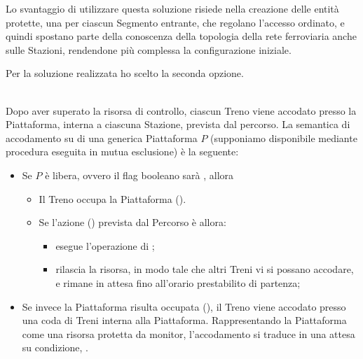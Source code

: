 \begin{description}
\begin{enumerate}
			Lo svantaggio di utilizzare questa soluzione risiede nella creazione delle entità protette, una per ciascun Segmento entrante, che regolano l'accesso ordinato, e quindi spostano parte della conoscenza della topologia della rete ferroviaria anche sulle Stazioni, rendendone più complessa la configurazione iniziale.
		\end{enumerate} 
		
		Per la soluzione realizzata ho scelto la seconda opzione.
		
		\item{}\\
		
		Dopo aver superato la risorsa di controllo, ciascun Treno viene accodato presso la Piattaforma, interna a ciascuna Stazione, prevista dal percorso. La semantica di accodamento su di una generica Piattaforma $P$ (supponiamo disponibile mediante procedura eseguita in mutua esclusione) è la seguente:
		\begin{itemize}
			\item Se $P$ è libera, ovvero il flag booleano  sarà , allora 
				\begin{itemize}
					\item Il Treno occupa la Piattaforma ().
					\item Se l'azione () prevista dal Percorso è  allora:
						\begin{itemize}
							\item esegue l'operazione di ;
							\item rilascia la risorsa, in modo tale che altri Treni vi si possano accodare, e rimane in attesa fino all'orario prestabilito di partenza;
						\end{itemize}
				\end{itemize} 
			\item Se invece la Piattaforma risulta occupata (), il Treno viene accodato presso una coda di Treni interna alla Piattaforma. Rappresentando la Piattaforma come una risorsa protetta da monitor, l'accodamento si traduce in una attesa su condizione, .
		\end{itemize}
			

\end{description}

